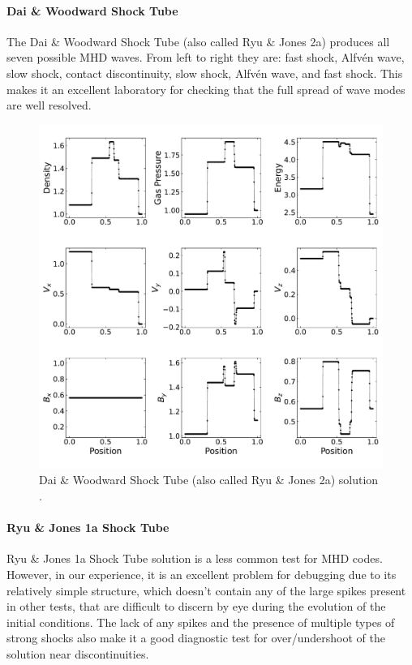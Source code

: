 \paragraph{Dai \& Woodward Shock Tube}

The Dai \& Woodward Shock Tube (also called Ryu \& Jones 2a) \citep{dai_woodward_1998, ryu_jones_1995} produces all seven possible MHD waves. From left to right they are: fast shock, Alfvén wave, slow shock, contact discontinuity, slow shock, Alfvén wave, and fast shock. This makes it an excellent laboratory for checking that the full spread of wave modes are well resolved.

\begin{figure}[ht!]
    \includegraphics[width=\linewidth]{assets/3-mhd-tests/d&w.pdf}
    \caption{Dai \& Woodward Shock Tube (also called Ryu \& Jones 2a) solution \citep{dai_woodward_1998, ryu_jones_1995}.
    }
    \label{fig:dai-and-woodward}
\end{figure}

\paragraph{Ryu \& Jones 1a Shock Tube}

Ryu \& Jones 1a Shock Tube solution \citep{ryu_jones_1995} is a less common test for MHD codes. However, in our experience, it is an excellent problem for debugging due to its relatively simple structure, which doesn't contain any of the large spikes present in other tests, that are difficult to discern by eye during the evolution of the initial conditions. The lack of any spikes and the presence of multiple types of strong shocks also make it a good diagnostic test for over/undershoot of the solution near discontinuities.

